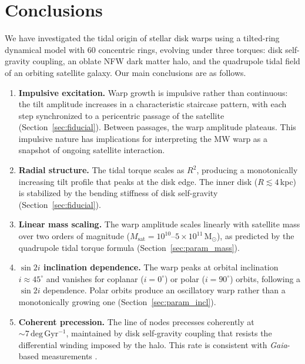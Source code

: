 \section{Conclusions}
\label{sec:conclusions}

We have investigated the tidal origin of stellar disk warps using a tilted-ring dynamical model with 60 concentric rings, evolving under three torques: disk self-gravity coupling, an oblate NFW dark matter halo, and the quadrupole tidal field of an orbiting satellite galaxy. Our main conclusions are as follows.

\begin{enumerate}
    \item \textbf{Impulsive excitation.} Warp growth is impulsive rather than continuous: the tilt amplitude increases in a characteristic staircase pattern, with each step synchronized to a pericentric passage of the satellite (Section~\ref{sec:fiducial}). Between passages, the warp amplitude plateaus. This impulsive nature has implications for interpreting the MW warp as a snapshot of ongoing satellite interaction.
    
    \item \textbf{Radial structure.} The tidal torque scales as $R^2$, producing a monotonically increasing tilt profile that peaks at the disk edge. The inner disk ($R\lesssim4$\,kpc) is stabilized by the bending stiffness of disk self-gravity (Section~\ref{sec:fiducial}).
    
    \item \textbf{Linear mass scaling.} The warp amplitude scales linearly with satellite mass over two orders of magnitude ($M_\mathrm{sat}=10^{10}$--$5\times10^{11}\,\mathrm{M}_\odot$), as predicted by the quadrupole tidal torque formula (Section~\ref{sec:param_mass}).
    
    \item \textbf{$\sin 2i$ inclination dependence.} The warp peaks at orbital inclination $i\approx45^\circ$ and vanishes for coplanar ($i=0^\circ$) or polar ($i=90^\circ$) orbits, following a $\sin 2i$ dependence. Polar orbits produce an oscillatory warp rather than a monotonically growing one (Section~\ref{sec:param_incl}).
    
    \item \textbf{Coherent precession.} The line of nodes precesses coherently at ${\sim}7\,\mathrm{deg\,Gyr^{-1}}$, maintained by disk self-gravity coupling that resists the differential winding imposed by the halo. This rate is consistent with \textit{Gaia}-based measurements \citep{poggio2020, cheng2020}.
    

\end{enumerate}
